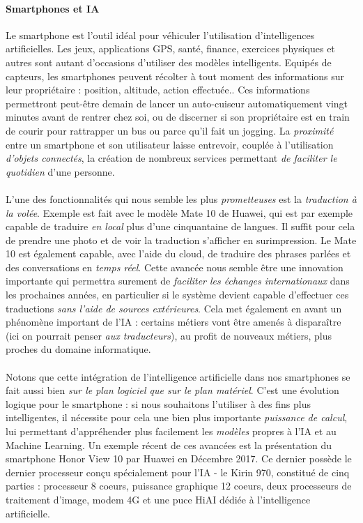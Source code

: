 \paragraph{Smartphones et IA} Le smartphone est l'outil idéal pour véhiculer l'utilisation d'intelligences artificielles. Les jeux,
applications GPS, santé, finance, exercices physiques et autres sont autant d'occasions d'utiliser des modèles intelligents. Equipés de capteurs,
les smartphones peuvent récolter à tout moment des informations sur leur propriétaire : position, altitude, action effectuée.. Ces informations
permettront peut-être demain de lancer un auto-cuiseur automatiquement vingt minutes avant de rentrer chez soi, ou de discerner si son 
propriétaire est en train de courir pour rattrapper un bus ou parce qu'il fait un jogging. \cite{Smartphone0} La \emph{proximité} entre 
un smartphone et son utilisateur laisse entrevoir, couplée à l'utilisation \emph{d'objets connectés}, la création de nombreux services
permettant \emph{de faciliter le quotidien} d'une personne. 

\paragraph{} L'une des fonctionnalités qui nous semble les plus \emph{prometteuses} est la \emph{traduction à la volée}. Exemple est fait
avec le modèle Mate 10 de Huawei, qui est par exemple capable de traduire \emph{en local} plus d'une cinquantaine de langues. Il suffit pour
cela de prendre une photo et de voir la traduction s'afficher en surimpression. \cite{Smartphone0} Le Mate 10 est également capable,
avec l'aide du cloud, de traduire des phrases parlées et des conversations en \emph{temps réel}. Cette avancée nous semble être une innovation
importante qui permettra surement de \emph{faciliter les échanges internationaux} dans les prochaines années, en particulier si le système devient
capable d'effectuer ces traductions \emph{sans l'aide de sources extérieures}. Cela met également en avant un phénomène important de l'IA : 
certains métiers vont être amenés à disparaître (ici on pourrait penser \emph{aux traducteurs}), au profit de nouveaux métiers, plus proches du
domaine informatique.

\paragraph{} Notons que cette intégration de l'intelligence artificielle dans nos smartphones se fait aussi bien \emph{sur le plan logiciel que
sur le plan matériel}. C'est une évolution logique pour le smartphone : si nous souhaitons l'utiliser à des fins plus intelligentes, il nécessite
pour cela une bien plus importante \emph{puissance de calcul}, lui permettant d'appréhender plus facilement les \emph{modèles} propres à l'IA et au
Machine Learning. Un exemple récent de ces avancées est la présentation du smartphone Honor View 10 par Huawei en Décembre 2017. \cite{Smartphone1}
Ce dernier possède le dernier processeur conçu spécialement pour l'IA - le Kirin 970, constitué de cinq parties : processeur 8 coeurs, puissance
graphique 12 coeurs, deux processeurs de traitement d'image, modem 4G et une puce HiAI dédiée à l'intelligence artificielle.

